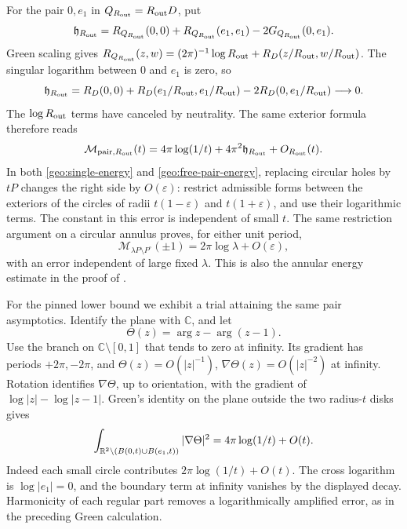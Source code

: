 For the pair \(0,e_1\) in \(Q_{R_{\rm out}}=R_{\rm out}D\), put
\[
 \mathfrak h_{R_{\rm out}}
   =R_{Q_{R_{\rm out}}}(0,0)+R_{Q_{R_{\rm out}}}(e_1,e_1)
                           -2G_{Q_{R_{\rm out}}}(0,e_1).
\]
Green scaling gives
\(R_{Q_{R_{\rm out}}}(z,w)=(2\pi)^{-1}\log R_{\rm out}
                         +R_D(z/R_{\rm out},w/R_{\rm out})\).
The singular logarithm between \(0\) and \(e_1\) is zero, so
\[
 \mathfrak h_{R_{\rm out}}
   =R_D(0,0)+R_D(e_1/R_{\rm out},e_1/R_{\rm out})
                           -2R_D(0,e_1/R_{\rm out})
                              \longrightarrow0.
\]
The \(\log R_{\rm out}\) terms have canceled by neutrality.  The same exterior
formula therefore reads
\begin{equation}\label{geo:free-pair-energy}
 \mathcal M_{{\rm pair},R_{\rm out}}(t)
        =4\pi\log(1/t)+4\pi^2\mathfrak h_{R_{\rm out}}
                                                +O_{R_{\rm out}}(t).
\end{equation}
In both \eqref{geo:single-energy} and \eqref{geo:free-pair-energy},
replacing circular holes by \(tP\) changes the right side by
\(O(\varepsilon)\): restrict admissible forms between the exteriors
of the circles of radii \(t(1-\varepsilon)\) and
\(t(1+\varepsilon)\), and use their logarithmic terms.  The constant
in this error is independent of small \(t\).  The same restriction
argument on a circular annulus proves, for either unit period,
\begin{equation}\label{geo:annular-energy}
 \mathcal M_{\lambda P\setminus P^\circ}(\pm1)
                   =2\pi\log\lambda+O(\varepsilon),
\end{equation}
with an error independent of large fixed \(\lambda\).  This is also
the annular energy estimate in the proof of
\cite[Proposition~5.3]{S}.

For the pinned lower bound we exhibit a trial attaining the same pair
asymptotics.  Identify the plane with \(\mathbb C\), and let
\[
                  \Theta(z)=\arg z-\arg(z-1).
\]
Use the branch on \(\mathbb C\setminus[0,1]\) that tends to zero at
infinity.  Its gradient has periods \(+2\pi,-2\pi\), and
\(\Theta(z)=O(|z|^{-1})\), \(\nabla\Theta(z)=O(|z|^{-2})\) at
infinity.  Rotation identifies \(\nabla\Theta\), up to orientation,
with the gradient of \(\log|z|-\log|z-1|\).  Green's identity on the
plane outside the two radius-\(t\) disks gives
\begin{equation}\label{geo:plane-pair-energy}
 \int_{\mathbb R^2\setminus(B(0,t)\cup B(e_1,t))}|\nabla\Theta|^2
                     =4\pi\log(1/t)+O(t).
\end{equation}
Indeed each small circle contributes \(2\pi\log(1/t)+O(t)\).
The cross logarithm is \(\log|e_1|=0\), and the boundary term at
infinity vanishes by the displayed decay.  Harmonicity of each regular
part removes a logarithmically amplified error, as in the preceding
Green calculation.

